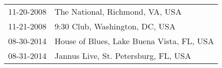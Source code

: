 \begin{supertabular}{ll}
 11-20-2008 &            The National, Richmond, VA, USA \\
 11-21-2008 &             9:30 Club, Washington, DC, USA \\
 08-30-2014 &  House of Blues, Lake Buena Vista, FL, USA \\
 08-31-2014 &       Jannus Live, St. Petersburg, FL, USA \\
\end{supertabular}
